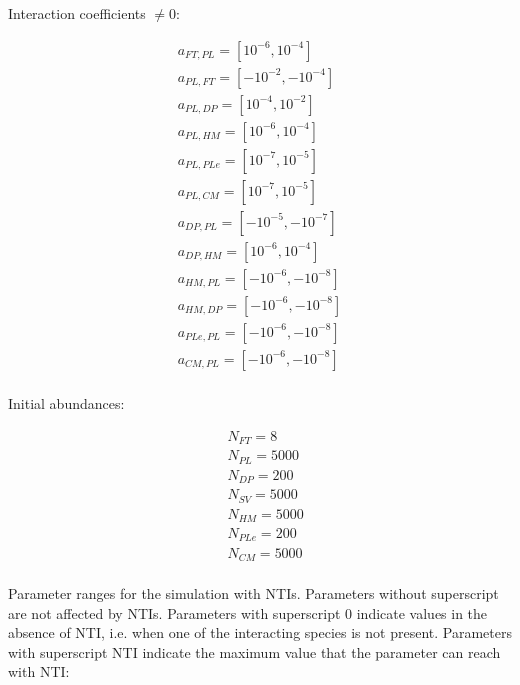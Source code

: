 Interaction coefficients $\neq 0$:

\begin{align*}
& a_{FT,PL} = [10^{-6},10^{-4}] \\
& a_{PL,FT} = [-10^{-2},-10^{-4}] \\
& a_{PL,DP} = [10^{-4},10^{-2}] \\
& a_{PL,HM} = [10^{-6},10^{-4}] \\
& a_{PL,PLe} = [10^{-7},10^{-5}] \\
& a_{PL,CM} = [10^{-7},10^{-5}] & \\
& a_{DP,PL} = [-10^{-5},-10^{-7}] \\
& a_{DP,HM} = [10^{-6},10^{-4}] \\
& a_{HM,PL} = [-10^{-6},-10^{-8}] \\
& a_{HM,DP} = [-10^{-6},-10^{-8}] \\
& a_{PLe,PL} = [-10^{-6},-10^{-8}] \\
& a_{CM,PL} = [-10^{-6},-10^{-8}] \\
\end{align*}

Initial abundances:

\begin{align*}
& N_{FT} = 8 \\
& N_{PL} = 5000 \\
& N_{DP} = 200 \\
& N_{SV} = 5000 \\
& N_{HM} = 5000 \\
& N_{PLe} = 200 \\
& N_{CM} = 5000 \\
\end{align*}

Parameter ranges for the simulation with NTIs. Parameters without superscript are not affected by NTIs. Parameters with superscript 0 indicate values in the absence of NTI, i.e. when one of the interacting species is not present. Parameters with superscript NTI indicate the maximum value that the parameter can reach with NTI:

